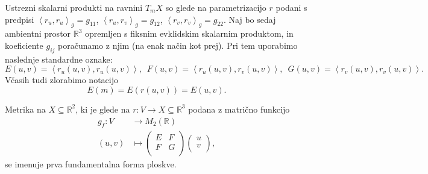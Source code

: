 Ustrezni skalarni produkti na ravnini $T_mX$ so glede na
parametrizacijo $r$ podani s predpisi $\left<r_u, r_u \right>_g  =
g_{11}$, $\left<r_u, r_v \right>_g  =
g_{12}$, $\left<r_v, r_v \right>_g  =
g_{22}$. Naj bo sedaj ambientni prostor $\mathbb{R}^3$ opremljen s
fiksnim evklidskim skalarnim produktom, in koeficiente $g_{ij}$
poračunamo z njim (na enak način kot prej). Pri tem uporabimo
naslednje standardne oznake: 
\begin{equation*} E(u,v) = \left<r_u(u,v), r_u(u,v) \right>,   \,\,\,   F(u,v) =  \left<r_u(u,v),
r_v(u,v) \right>, \,\,\,     G(u,v) =  \left<r_v(u,v), r_v(u,v)
\right>.  \end{equation*}
Včasih tudi zlorabimo notacijo 
\begin{equation*} E(m) = E(r(u,v)) = E(u,v). \end{equation*}

\begin{definicija}
\label{def_prva_fundamentalna_forma}
 Metrika na $X \subseteq  \mathbb{R}^2$, ki je glede na $r: V \to  X
\subseteq  \mathbb{R}^3$ podana z matrično funkcijo \begin{align*}
 	g_f: V &\longrightarrow M_2(\mathbb{R}) \\
	(u,v) &\longmapsto 
\begin{pmatrix}
	E & F \\
	F & G \\
\end{pmatrix}
\begin{pmatrix}
	u \\
	v \\
\end{pmatrix},
\end{align*}
se imenuje prva fundamentalna forma ploskve.
\end{definicija}

